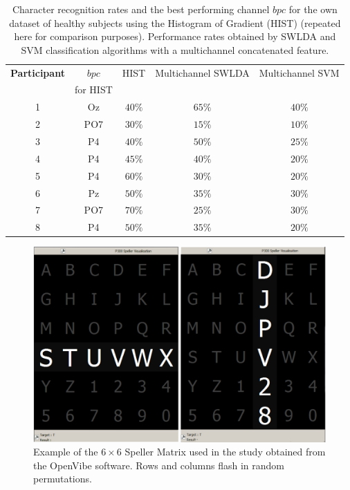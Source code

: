 \documentclass[utf8]{frontiersSCNS} %
\begin{document}
\begin{table}[htb]
\caption{Character recognition rates and the best performing channel $bpc$ for the own dataset of healthy subjects using the Histogram of Gradient (HIST) (repeated here for comparison purposes).   Performance rates obtained by SWLDA and SVM classification algorithms with a multichannel concatenated feature.}
\centering
\begin{tabular}{c|cc|c|c}
\toprule
\textbf{Participant}	&  $bpc$ 	&  HIST & Multichannel SWLDA & Multichannel SVM  \\
                                    &  for HIST        &           &                                       &   \\
\midrule
1     &     Oz   &     $40\%$  &     $65\%$  &     $40\%$ \\
2     &     PO7   &     $30\%$ &   $15\%$  &     $10\%$ \\
3     &     P4   &     $40\%$ &     $50\%$  &     $25\%$ \\
4     &     P4   &     $45\%$ &     $40\%$  &     $20\%$ \\
5     &     P4   &      $60\%$ &    $30\%$  &     $20\%$ \\
6     &     Pz   &      $50\%$ &    $35\%$  &     $30\%$ \\
7     &     PO7   &      $70\%$ &  $25\%$  &     $30\%$ \\
8     &     P4   &      $50\%$ &    $35\%$  &     $20\%$ \\

\end{tabular}
\label{tab:resultsownswlda}
\end{table}


\begin{figure}[h!]
\centering
\includegraphics[width=15cm]{openvibep300matrix.png}
\caption{Example of the $6 \times 6$ Speller Matrix used in the study obtained from the OpenVibe software.  Rows and columns flash in random permutations.}
\label{fig:p300matrix}
\end{figure}
\end{document}
